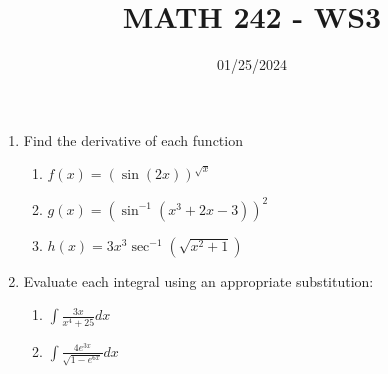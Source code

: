 \documentclass[12pt]{article}
\title{MATH 242 - WS3}
\date{01/25/2024}
\begin{document}
\maketitle


\begin{enumerate}

\item Find the derivative of each function
\begin{enumerate}
    \item $f(x)=(\sin(2x))^{\sqrt{x}}$
    \vfill
    \item $g(x)=(\sin^{-1}(x^3+2x-3))^2$
    \vfill
    \item $h(x)=3x^3\sec^{-1}(\sqrt{x^2+1})$
    \vfill
\end{enumerate}

\pagebreak

\item Evaluate each integral using an appropriate substitution:
\begin{enumerate}
    \item $\int\frac{3x}{x^4+25}dx$
    \vfill
    \item $\int\frac{4e^{3x}}{\sqrt{1-e^{6x}}}dx$
    \vfill
\end{enumerate}

\end{enumerate}
\end{document}
